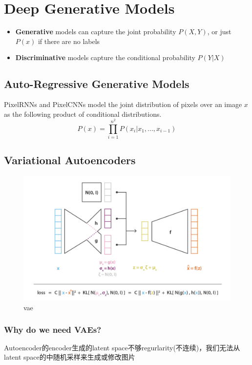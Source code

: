 \chapter{Deep Generative Models}

\begin{itemize}
    \item \textbf{Generative} models can capture the joint probability $P(X, Y)$, or just $P(x)$ if there are no labels
    \item \textbf{Discriminative} models capture the conditional probability $P(Y|X)$
\end{itemize}

\section{Auto-Regressive Generative Models}
PixelRNNs and PixelCNNs model the joint distribution of pixels over an image $x$ as the following
product of conditional distributions.
\begin{equation}
    P(x) = \prod^{n^2}_{i=1}P(x_{i}|x_1,...,x_{i-1})
\end{equation}

\section{Variational Autoencoders}
\begin{figure}[H]
    \centering
    \includegraphics[width=12cm]{images/vae.png}
    \caption{vae}
    \label{fig:VAE}
\end{figure}
\subsection{Why do we need VAEs?}

Autoencoder的encoder生成的latent space不够regurlarity(不连续)，我们无法从latent space的中随机采样来生成或修改图片


